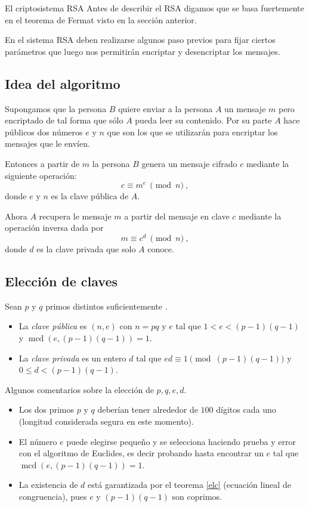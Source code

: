\begin{section}{El criptosistema RSA}
Antes de describir el RSA digamos que se basa fuertemente en el teorema de Fermat visto en la sección anterior. 


En el sistema RSA deben realizarse algunos paso previos para fijar ciertos parámetros que luego nos permitirán encriptar y desencriptar los mensajes.



\subsection*{Idea del  algoritmo}

Supongamos que la persona $B$  quiere enviar a la persona $A$ un mensaje $m$ pero encriptado de tal forma que sólo $A$ pueda leer su contenido. Por su parte $A$ hace públicos dos números $e$ y $n$ que son los que se utilizarán para encriptar los mensajes que le envíen. 

Entonces a partir de $m$ la persona $B$ genera un mensaje cifrado $c$ mediante la siguiente ope\-ra\-ción:
$$
    c\equiv m^e\ \pmod{n}\ ,
$$
donde $e$ y $n$ es la clave pública de $A$.

Ahora $A$ recupera le mensaje $m$ a partir del mensaje en clave $c$ mediante la operación inversa dada por
$$
    m\equiv c^d\ \pmod{n}\ ,
$$
donde $d$ es la clave privada que solo $A$ conoce.




\subsection*{Elección de claves}



Sean  $p$ y $q$ primos distintos suficientemente . 
\begin{itemize}
    \item  La \emph{clave pública} es $(n, e)$ con $n = pq$ y $e$ tal que $1 < e < (p-1)(q-1)$ y $\operatorname{mcd}(e, (p-1)(q-1)) = 1$. 
    \item  La \emph{clave privada} es un entero $d$ tal que $ed \equiv 1 \pmod{(p-1)(q-1)}$ y $0 \le d <(p-1)(q-1)$.
\end{itemize}


\begin{observacion*} Algunos comentarios sobre la elección de $p,q,e,d$.
\begin{itemize}
\item
Los dos primos $p$ y $q$ deberían tener alrededor de $100$ dígitos cada uno (longitud considerada segura en este momento).
\item
El número $e$ puede elegirse pequeño y se selecciona haciendo prueba y error con el algoritmo de Euclides, es decir probando hasta encontrar un $e$ tal que $\operatorname{mcd}(e, (p-1)(q-1)) = 1$.
\item
La existencia de $d$ está garantizada por el teorema \ref{elc} (ecuación lineal de congruencia), pues $e$ y $(p-1)(q-1)$ son coprimos.
\end{itemize}


\end{observacion*}
\end{section}
